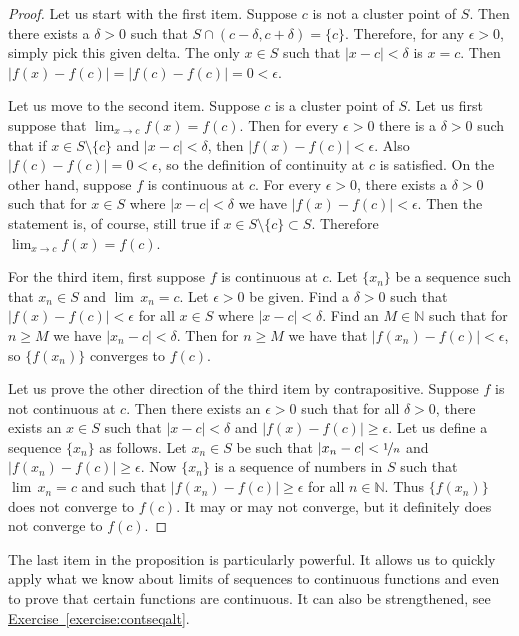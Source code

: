 \documentclass[12pt]{book}
\newcommand{\abs}[1]{\left\lvert {#1} \right\rvert}
\newcommand{\N}{{\mathbb{N}}}
\theoremstyle{plain}
\theoremstyle{remark}
\theoremstyle{definition}
\theoremstyle{exercise}
\theoremstyle{example}
\newcommand{\exerciseref}[1]{\hyperref[#1]{Exercise~\ref*{#1}}}
\begin{document}
\begin{proof}
Let us start with the first item.  Suppose $c$ is not a cluster point of
$S$.  Then there exists a $\delta > 0$
such that $S \cap (c-\delta,c+\delta) = \{
c \}$.  Therefore, for any $\epsilon > 0$, simply pick this given delta.
The only $x \in S$ such that $\abs{x-c} < \delta$ is $x=c$.  Then
$\abs{f(x)-f(c)} = \abs{f(c)-f(c)} = 0 < \epsilon$.

Let us move to the second item.
Suppose $c$ is a cluster point of $S$.  Let us first suppose
that $\lim_{x\to c} f(x) = f(c)$.  Then for every $\epsilon > 0$
there is a $\delta > 0$ such that if $x \in S \setminus \{ c \}$
and $\abs{x-c} < \delta$, then $\abs{f(x)-f(c)} < \epsilon$.
Also $\abs{f(c)-f(c)} = 0 < \epsilon$, so the definition of continuity at
$c$ is satisfied.  On the other hand, suppose $f$ is continuous
at $c$.  For every $\epsilon > 0$, there exists a $\delta > 0$
such that for $x \in S$ where $\abs{x-c} < \delta$ we have
$\abs{f(x)-f(c)} < \epsilon$.  Then the statement is, of course, still true if
$x \in S \setminus \{ c \} \subset S$.  Therefore $\lim_{x\to c} f(x) =
f(c)$.

For the third item, first suppose $f$ is continuous at $c$.  Let $\{ x_n \}$
be a sequence such that $x_n \in S$ and $\lim\, x_n = c$.  Let $\epsilon > 0$
be given.  Find a $\delta > 0$ such that $\abs{f(x)-f(c)} < \epsilon$
for all $x \in S$ where $\abs{x-c} < \delta$.  Find an $M \in \N$
such that for $n \geq M$ we have $\abs{x_n-c} < \delta$.  Then for
$n \geq M$ we have that $\abs{f(x_n)-f(c)} < \epsilon$, so $\{ f(x_n) \}$
converges to $f(c)$.

Let us prove the other direction of the third item by contrapositive.
Suppose $f$ is not
continuous at $c$.  Then there exists an $\epsilon > 0$
such that for all $\delta > 0$, there exists an $x \in S$
such that $\abs{x-c} < \delta$ and $\abs{f(x)-f(c)} \geq \epsilon$.
Let us define a sequence $\{ x_n \}$ as follows.
Let $x_n \in S$ be such that $\abs{x_n-c} < \nicefrac{1}{n}$
and $\abs{f(x_n)-f(c)} \geq \epsilon$.
Now $\{ x_n \}$ is
a sequence of numbers in $S$ such that
$\lim\, x_n = c$ and such that
$\abs{f(x_n)-f(c)} \geq \epsilon$ for all $n \in \N$.  Thus $\{ f(x_n) \}$
does not converge to $f(c)$.  It may or may not converge, but it definitely
does not converge to $f(c)$.  
\end{proof}

The last item in the proposition is particularly powerful.  It allows us to
quickly apply what we know about limits of sequences to continuous functions
and even to prove that certain functions are continuous.
It can also be strengthened, see \exerciseref{exercise:contseqalt}.
\end{document}
